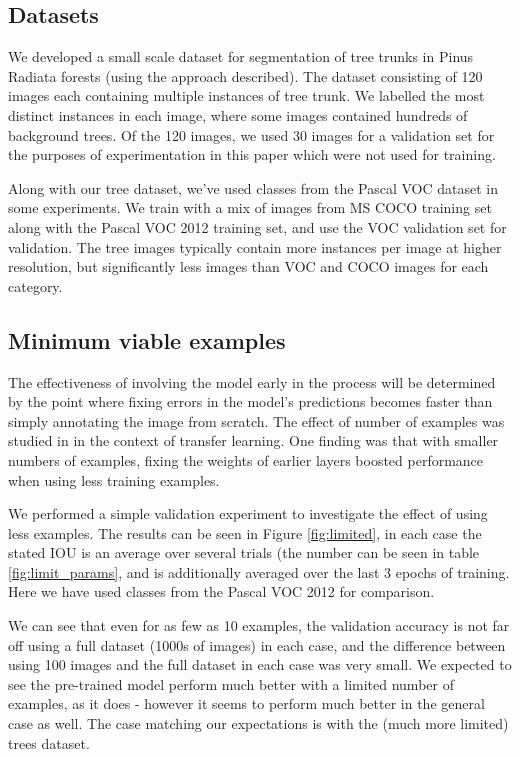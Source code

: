 \subsection {Datasets}




We developed a small scale dataset for segmentation of tree trunks in Pinus Radiata forests (using the approach described). The dataset consisting of 120 images each containing multiple instances of tree trunk. We labelled the most distinct instances in each image, where some images contained hundreds of background trees. Of the 120 images, we used 30 images for a validation set for the purposes of experimentation in this paper which were not used for training.

Along with our tree dataset, we've used classes from the Pascal VOC dataset in some experiments. We train with a mix of images from MS COCO \cite{Lin2014} training set along with the Pascal VOC 2012 training set, and use the VOC validation set for validation. The tree images typically contain more instances per image at higher resolution, but significantly less images than VOC and COCO images for each category.


\subsection {Minimum viable examples}

The effectiveness of involving the model early in the process will be determined by the point where fixing errors in the model's predictions becomes faster than simply annotating the image from scratch. The effect of number of examples was studied in \cite{Soekhoe} in the context of transfer learning. One finding was that with smaller numbers of examples, fixing the weights of earlier layers boosted performance when using less training examples.

We performed a simple validation experiment to investigate the effect of using less examples. The results can be seen in Figure \ref{fig:limited}, in each case the stated IOU is an average over several trials (the number can be seen in table \ref{fig:limit_params}, and is additionally averaged over the last 3 epochs of training. Here we have used classes from the Pascal VOC 2012 for comparison.

We can see that even for as few as 10 examples, the validation accuracy is not far off using a full dataset (1000s of images) in each case, and the difference between using 100 images and the full dataset in each case was very small. We expected to see the pre-trained model perform much better with a limited number of examples, as it does - however it seems to perform much better in the general case as well. The case matching our expectations is with the (much more limited) trees dataset.



